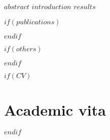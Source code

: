 \documentclass[11pt, a4paper, twoside]{MPIthesis} %
\begin{document}
\pagestyle{fancy} %
$abstract$
$introduction$
%
$results$

%



\appendix %

$if(publications)$
  
$endif$

$if(others)$
  
$endif$

$if(CV)$
 \chapter{Academic vita}
 \begin{singlespacing}
 
 \end{singlespacing}
$endif$


\backmatter




\end{document}
